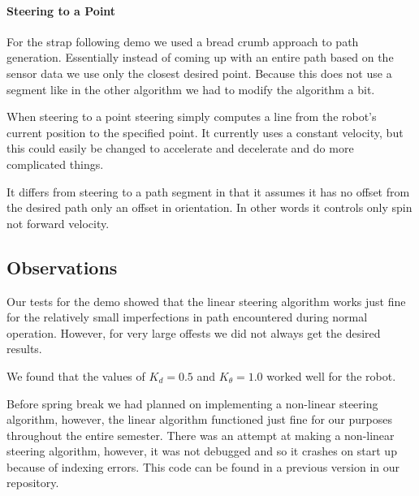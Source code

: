 \paragraph{Steering to a Point}

For the strap following demo we used a bread crumb approach to path generation. Essentially instead of coming up with an entire path based on the sensor data we use only the closest desired point. Because this does not use a segment like in the other algorithm we had to modify the algorithm a bit.

When steering to a point steering simply computes a line from the robot's current position to the specified point. It currently uses a constant velocity, but this could easily be changed to accelerate and decelerate and do more complicated things.

It differs from steering to a path segment in that it assumes it has no offset from the desired path only an offset in orientation. In other words it controls only spin not forward velocity.

\subsection{Observations}

Our tests for the demo showed that the linear steering algorithm works
just fine for the relatively small imperfections in path encountered
during normal operation. However, for very large offests we did not
always get the desired results.

We found that the values of $K_d=0.5$ and $K_\theta = 1.0$ worked well
for the robot.

Before spring break we had planned on implementing a non-linear steering algorithm, however, the linear algorithm functioned just fine for our purposes throughout the entire semester. There was an attempt at making a non-linear steering algorithm, however, it was not debugged and so it crashes on start up because of indexing errors. This code can be found in a previous version in our repository.
